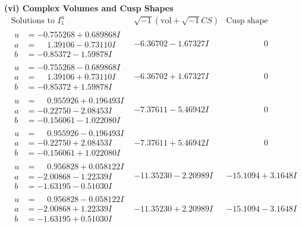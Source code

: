 \documentclass[1p]{elsarticle_modified}
\theoremstyle{definition}
\newcommand{\I}{\sqrt{-1}}
\begin{document}
\newpage\flushleft \textbf{(vi) Complex Volumes and Cusp Shapes}
$$\begin{array}{c|c|c}  
\text{Solutions to }I^u_{1}& \I (\text{vol} + \sqrt{-1}CS) & \text{Cusp shape}\\
 \hline 
\begin{aligned}
u &= -0.755268 + 0.689868 I \\
a &= \phantom{-}1.39106 - 0.73110 I \\
b &= -0.85372 - 1.59878 I\end{aligned}
 & -6.36702 - 1.67327 I & \phantom{-0.000000 } 0 \\ \hline\begin{aligned}
u &= -0.755268 - 0.689868 I \\
a &= \phantom{-}1.39106 + 0.73110 I \\
b &= -0.85372 + 1.59878 I\end{aligned}
 & -6.36702 + 1.67327 I & \phantom{-0.000000 } 0 \\ \hline\begin{aligned}
u &= \phantom{-}0.955926 + 0.196493 I \\
a &= -0.22750 - 2.08453 I \\
b &= -0.156061 - 1.022080 I\end{aligned}
 & -7.37611 - 5.46942 I & \phantom{-0.000000 } 0 \\ \hline\begin{aligned}
u &= \phantom{-}0.955926 - 0.196493 I \\
a &= -0.22750 + 2.08453 I \\
b &= -0.156061 + 1.022080 I\end{aligned}
 & -7.37611 + 5.46942 I & \phantom{-0.000000 } 0 \\ \hline\begin{aligned}
u &= \phantom{-}0.956828 + 0.058122 I \\
a &= -2.00868 - 1.22339 I \\
b &= -1.63195 - 0.51030 I\end{aligned}
 & -11.35230 - 2.20989 I & -15.1094 + 3.1648 I \\ \hline\begin{aligned}
u &= \phantom{-}0.956828 - 0.058122 I \\
a &= -2.00868 + 1.22339 I \\
b &= -1.63195 + 0.51030 I\end{aligned}
 & -11.35230 + 2.20989 I & -15.1094 - 3.1648 I \\ \hline\begin{aligned}

\end{aligned}
\end{array}$$
\end{document}
